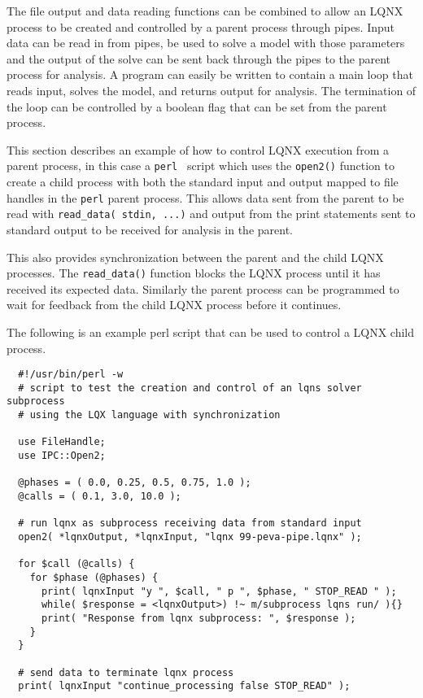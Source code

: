 The file output and data reading functions can be combined to allow an LQNX process to be created and controlled
by a parent process through pipes. Input data can be read in from pipes, be used to solve a model with those
parameters and the output of the solve can be sent back through the pipes to the parent process for analysis.
A \ModLang program can easily be written to contain a main loop that reads input, solves the model, and returns
output for analysis. The termination of the loop can be controlled by a boolean flag that can be set from the
parent process.

This section describes an example of how to control LQNX execution from a parent process, in this case a {\tt perl }
script which uses the {\tt open2()} function to create a child process with both the standard input and output
mapped to file handles in the {\tt perl} parent process. This allows data sent from the parent to be read with
{\tt read\_data( stdin, ...)} and output from the \ModLang print statements sent to standard output to be received for
analysis in the parent.

This also provides synchronization between the parent and the child
LQNX processes. The {\tt read\_data()} function
blocks the LQNX process until it has received its expected data. Similarly the parent process can be programmed
to wait for feedback from the child LQNX process before it continues.

The following is an example perl script that can be used to control a LQNX child process.

\lstset{language=Perl}
\begin{lstlisting}
  #!/usr/bin/perl -w
  # script to test the creation and control of an lqns solver subprocess
  # using the LQX language with synchronization

  use FileHandle;
  use IPC::Open2;

  @phases = ( 0.0, 0.25, 0.5, 0.75, 1.0 );
  @calls = ( 0.1, 3.0, 10.0 );

  # run lqnx as subprocess receiving data from standard input
  open2( *lqnxOutput, *lqnxInput, "lqnx 99-peva-pipe.lqnx" );

  for $call (@calls) {
    for $phase (@phases) {
      print( lqnxInput "y ", $call, " p ", $phase, " STOP_READ " );
      while( $response = <lqnxOutput>) !~ m/subprocess lqns run/ ){}
      print( "Response from lqnx subprocess: ", $response );
    }
  }

  # send data to terminate lqnx process
  print( lqnxInput "continue_processing false STOP_READ" );
\end{lstlisting}


